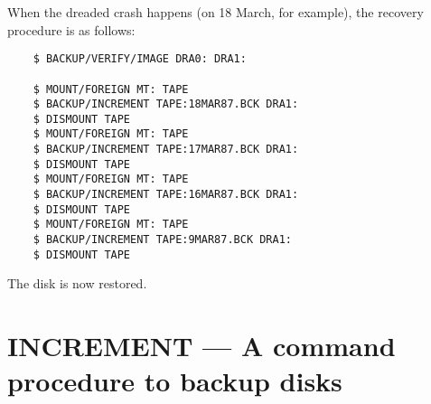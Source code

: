 When the dreaded crash happens (on 18 March, for example), the recovery
procedure is as follows:
\begin{verbatim}
    $ BACKUP/VERIFY/IMAGE DRA0: DRA1:

    $ MOUNT/FOREIGN MT: TAPE
    $ BACKUP/INCREMENT TAPE:18MAR87.BCK DRA1:
    $ DISMOUNT TAPE
    $ MOUNT/FOREIGN MT: TAPE
    $ BACKUP/INCREMENT TAPE:17MAR87.BCK DRA1:
    $ DISMOUNT TAPE
    $ MOUNT/FOREIGN MT: TAPE
    $ BACKUP/INCREMENT TAPE:16MAR87.BCK DRA1:
    $ DISMOUNT TAPE
    $ MOUNT/FOREIGN MT: TAPE
    $ BACKUP/INCREMENT TAPE:9MAR87.BCK DRA1:
    $ DISMOUNT TAPE
\end{verbatim}
The disk is now restored.
\appendix
\newpage
\section{INCREMENT --- A command procedure to backup disks}
